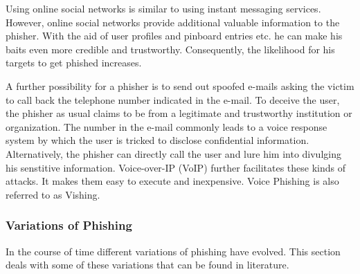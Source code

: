 \begin{description}[leftmargin=0cm]
	\item[Online Social Networks] Using online social networks is similar to using instant messaging services.
 However, online social networks provide additional valuable information to the phisher.
 With the aid of user profiles and pinboard entries etc.
 he can make his baits even more credible and trustworthy.
 Consequently, the likelihood for his targets to get phished increases.

	\item[Voice Phishing] A further possibility for a phisher is to send out spoofed e-mails asking the victim to call back the telephone number indicated in the e-mail.
 To deceive the user, the phisher as usual claims to be from a legitimate and trustworthy institution or organization.
 The number in the e-mail commonly leads to a voice response system by which the user is tricked to disclose confidential information.
 Alternatively, the phisher can directly call the user and lure him into divulging his senstitive information.
 Voice-over-IP (VoIP) further facilitates these kinds of attacks.
 It makes them easy to execute and inexpensive.
 Voice Phishing is also referred to as Vishing.

\end{description}

\subsubsection{Variations of Phishing}
In the course of time different variations of phishing have evolved.
 This section deals with some of these variations that can be found in literature.

\label{s:phishing_variations}

